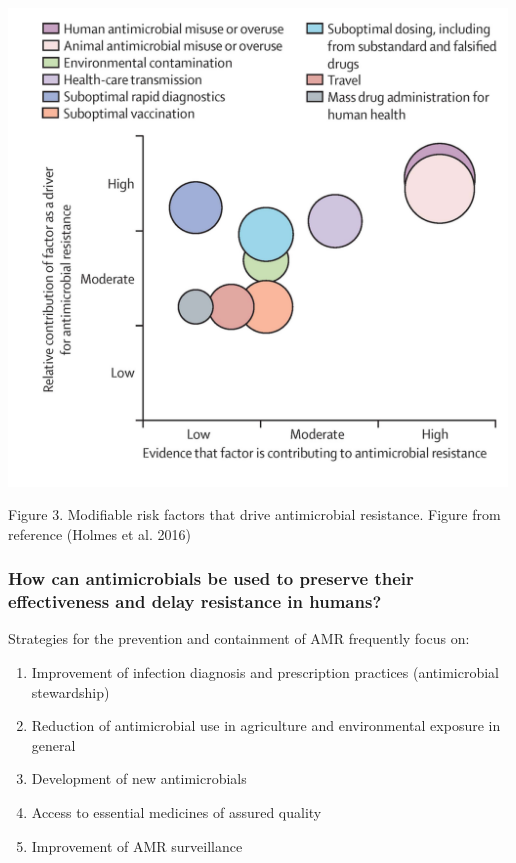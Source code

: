 \documentclass[]{tufte-handout}
\providecommand{\tightlist}{%
  \setlength{\itemsep}{0pt}\setlength{\parskip}{0pt}}
\begin{document}
\includegraphics[width=5.20833in,height=\textheight]{images/modifiablerisk.png}

Figure 3. Modifiable risk factors that drive antimicrobial resistance.
Figure from reference (Holmes et al. 2016)

\hypertarget{how-can-antimicrobials-be-used-to-preserve-their-effectiveness-and-delay-resistance-in-humans}{%
\subsubsection*{How can antimicrobials be used to preserve their
effectiveness and delay resistance in
humans?}\label{how-can-antimicrobials-be-used-to-preserve-their-effectiveness-and-delay-resistance-in-humans}}

Strategies for the prevention and containment of AMR frequently focus
on:

\begin{enumerate}
\def\labelenumi{\arabic{enumi}.}
\tightlist
\item
  Improvement of infection diagnosis and prescription practices
  (antimicrobial stewardship)
\item
  Reduction of antimicrobial use in agriculture and environmental
  exposure in general
\item
  Development of new antimicrobials
\item
  Access to essential medicines of assured quality
\item
  Improvement of AMR surveillance
\end{enumerate}
\end{document}
